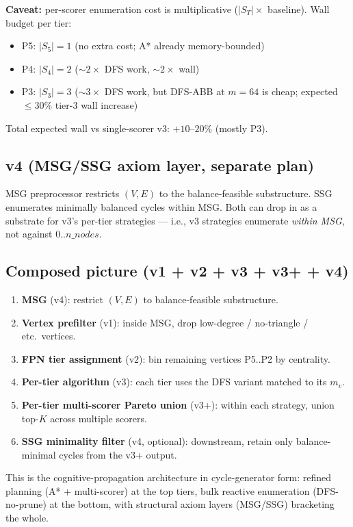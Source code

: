 \documentclass[11pt,a4paper]{article}
\begin{document}
\textbf{Caveat:} per-scorer enumeration cost is multiplicative
($|S_T| \times$ baseline).  Wall budget per tier:
\begin{itemize}
\item P5: $|S_5| = 1$ (no extra cost; A* already memory-bounded)
\item P4: $|S_4| = 2$ ($\sim 2\times$ DFS work, $\sim 2\times$ wall)
\item P3: $|S_3| = 3$ ($\sim 3\times$ DFS work, but DFS-ABB at
  $m{=}64$ is cheap; expected $\le 30\%$ tier-3 wall increase)
\end{itemize}
Total expected wall vs single-scorer v3: $+10$--$20\%$ (mostly P3).

\subsection*{v4 (MSG/SSG axiom layer, separate plan)}
MSG preprocessor restricts $(V, E)$ to the balance-feasible
substructure.  SSG enumerates minimally balanced cycles within MSG.
Both can drop in as a substrate for v3's per-tier strategies ---
i.e., v3 strategies enumerate \emph{within MSG}, not against
$0..n\_nodes$.

\subsection*{Composed picture (v1 + v2 + v3 + v3+ + v4)}
\begin{enumerate}
\item \textbf{MSG} (v4): restrict $(V, E)$ to balance-feasible
  substructure.
\item \textbf{Vertex prefilter} (v1): inside MSG, drop low-degree
  / no-triangle / etc.\ vertices.
\item \textbf{FPN tier assignment} (v2): bin remaining vertices
  P5..P2 by centrality.
\item \textbf{Per-tier algorithm} (v3): each tier uses the DFS
  variant matched to its $m_v$.
\item \textbf{Per-tier multi-scorer Pareto union} (v3+): within
  each strategy, union top-$K$ across multiple scorers.
\item \textbf{SSG minimality filter} (v4, optional): downstream,
  retain only balance-minimal cycles from the v3+ output.
\end{enumerate}

This is the cognitive-propagation architecture in cycle-generator
form: refined planning (A* + multi-scorer) at the top tiers, bulk
reactive enumeration (DFS-no-prune) at the bottom, with structural
axiom layers (MSG/SSG) bracketing the whole.
\end{document}
